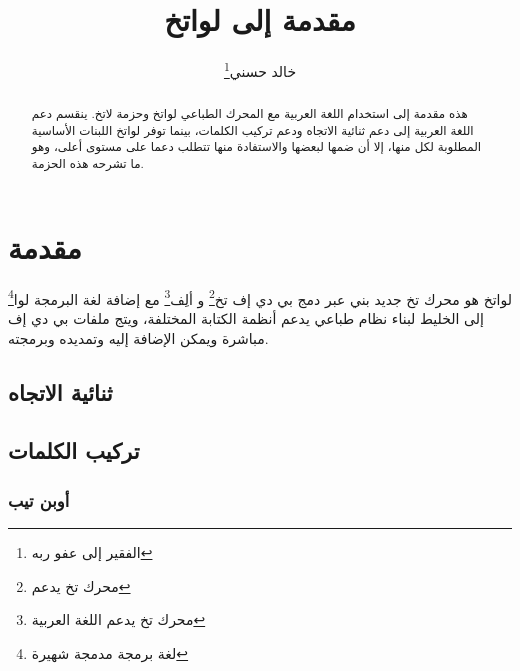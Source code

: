 \documentclass{article}
\begin{document}
\author{خالد حسني\footnote{الفقير إلى عفو ربه}}
\title{مقدمة إلى لواتخ}
\maketitle
\tableofcontents

\begin{abstract}
هذه مقدمة إلى استخدام اللغة العربية مع المحرك الطباعي لواتخ وحزمة لاتخ. ينقسم دعم اللغة العربية إلى دعم ثنائية الاتجاه ودعم تركيب الكلمات، بينما توفر لواتخ اللبنات الأساسية المطلوبة لكل منها، إلا أن ضمها لبعضها والاستفادة منها تتطلب دعما على مستوى أعلى، وهو ما تشرحه هذه الحزمة.
\end{abstract}

\section{مقدمة}
لواتخ هو محرك تخ جديد بني عبر دمج بي دي إف تخ\footnote{محرك تخ يدعم } و ألِف\footnote{محرك تخ يدعم اللغة العربية} مع إضافة لغة البرمجة لوا\footnote{لغة برمجة مدمجة شهيرة} إلى الخليط لبناء نظام طباعي يدعم أنظمة الكتابة المختلفة، ويتج ملفات بي دي إف مباشرة ويمكن الإضافة إليه وتمديده وبرمجته.
\subsection{ثنائية الاتجاه}

\subsection{تركيب الكلمات}
\subsubsection{أوبن تيب}
\end{document}
